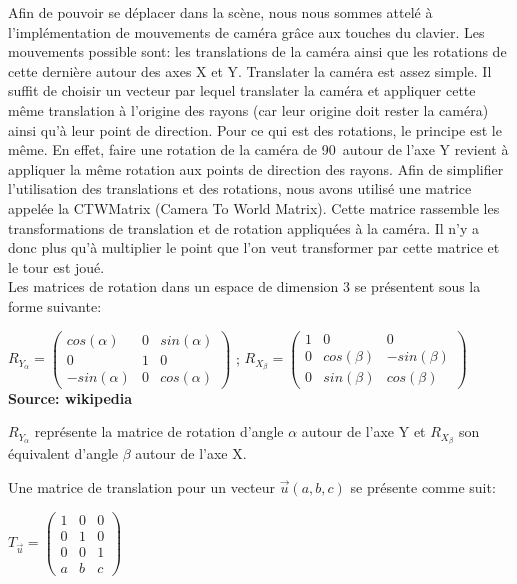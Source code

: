 \documentclass[../../Rapport RayTracer]{subfiles}
\begin{document}
Afin de pouvoir se déplacer dans la scène, nous nous sommes attelé à l'implémentation de mouvements de caméra grâce aux touches du clavier. Les mouvements possible sont: les translations de la caméra ainsi que les rotations de cette dernière autour des axes X et Y. Translater la caméra est assez simple. Il suffit de choisir un vecteur par lequel translater la caméra et appliquer cette même translation à l'origine des rayons (car leur origine doit rester la caméra) ainsi qu'à leur point de direction. Pour ce qui est des rotations, le principe est le même. En effet, faire une rotation de la caméra de 90\degree\ autour de l'axe Y revient à appliquer la même rotation aux points de direction des rayons. Afin de simplifier l'utilisation des translations et des rotations, nous avons utilisé une matrice appelée la CTWMatrix (Camera To World Matrix). Cette matrice rassemble les transformations de translation et de rotation appliquées à la caméra. Il n'y a donc plus qu'à multiplier le point que l'on veut transformer par cette matrice et le tour est joué.\\
Les matrices de rotation dans un espace de dimension 3 se présentent sous la forme suivante:

\begin{center}
	$R_{Y_{\alpha}} =
	\begin{pmatrix}
		cos(\alpha) & 0 & sin(\alpha)\\
		0 & 1 & 0\\
		-sin(\alpha) & 0 & cos(\alpha)
	\end{pmatrix}
	$ ;
	$R_{X_{\beta}} = 
	\begin{pmatrix}
		1 & 0 & 0\\
		0 & cos(\beta) & -sin(\beta)\\
		0 & sin(\beta) & cos(\beta)
	\end{pmatrix}
	$\\
	\textbf{Source: wikipedia} \cite{wikipediaRotationMatrices}
\end{center}
$R_{Y_{\alpha}}$ représente la matrice de rotation d'angle $\alpha$ autour de l'axe Y et $R_{X_{\beta}}$ son équivalent d'angle $\beta$ autour de l'axe X.

Une matrice de translation pour un vecteur $\overrightarrow{u}(a, b, c)$ se présente comme suit:
\begin{center}
	$T_{\overrightarrow{u}} =
	\begin{pmatrix}
		1 & 0 & 0\\
		0 & 1 & 0\\
		0 & 0 & 1\\
		a & b & c
	\end{pmatrix}
	$
\end{center}
\end{document}
